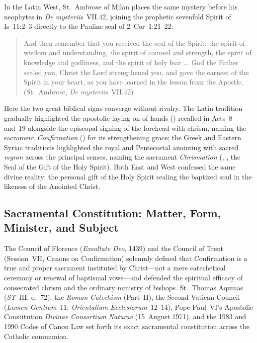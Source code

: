 In the Latin West, St.~Ambrose of Milan places the same mystery before his neophytes in \emph{De mysteriis}~VII.42, joining the prophetic sevenfold Spirit of Is~11:2--3 directly to the Pauline seal of 2~Cor~1:21--22:
\begin{quotation}
And then remember that you received the seal of the Spirit; the spirit of wisdom and understanding, the spirit of counsel and strength, the spirit of knowledge and godliness, and the spirit of holy fear \dots\ God the Father sealed you, Christ the Lord strengthened you, and gave the earnest of the Spirit in your heart, as you have learned in the lesson from the Apostle. (St.~Ambrose, \emph{De mysteriis}~VII.42)
\end{quotation}
Here the two great biblical signs converge without rivalry. The Latin tradition gradually highlighted the apostolic laying on of hands () recalled in Acts~8 and~19 alongside the episcopal signing of the forehead with chrism, naming the sacrament \emph{Confirmation} () for its strengthening grace; the Greek and Eastern Syriac traditions highlighted the royal and Pentecostal anointing with sacred \emph{myron} across the principal senses, naming the sacrament \emph{Chrismation} (, , the Seal of the Gift of the Holy Spirit). Both East and West confessed the same divine reality: the personal gift of the Holy Spirit sealing the baptized soul in the likeness of the Anointed Christ.

\subsection{Sacramental Constitution: Matter, Form, Minister, and Subject}
\label{subsec:confirmation-constitution}

The Council of Florence (\emph{Exsultate Deo}, 1439) and the Council of Trent (Session~VII, Canons on Confirmation) solemnly defined that Confirmation is a true and proper sacrament instituted by Christ---not a mere catechetical ceremony or renewal of baptismal vows---and defended the spiritual efficacy of consecrated chrism and the ordinary ministry of bishops. St.~Thomas Aquinas (\emph{ST}~III, q.~72), the \emph{Roman Catechism} (Part~II), the Second Vatican Council (\emph{Lumen Gentium}~11; \emph{Orientalium Ecclesiarum}~12--14), Pope Paul~VI's Apostolic Constitution \emph{Divinae Consortium Naturae} (15~August 1971), and the 1983 and 1990 Codes of Canon Law set forth its exact sacramental constitution across the Catholic communion.

